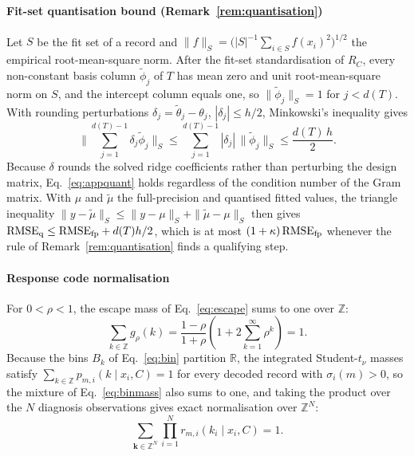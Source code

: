 \paragraph{Fit-set quantisation bound (Remark~\ref{rem:quantisation})} Let \(S\) be the fit set of a record and \(\|f\|_S=\big(|S|^{-1}\sum_{i\in S}f(x_i)^2\big)^{1/2}\) the empirical root-mean-square norm. After the fit-set standardisation of \(R_C\), every non-constant basis column \(\widetilde\phi_j\) of \(T\) has mean zero and unit root-mean-square norm on \(S\), and the intercept column equals one, so \(\|\widetilde\phi_j\|_S=1\) for \(j<d(T)\). With rounding perturbations \(\delta_j=\widetilde\theta_j-\theta_j\), \(|\delta_j|\le h/2\), Minkowski's inequality gives
\begin{equation}\label{eq:appquant}
\Big\|\sum_{j=1}^{d(T)-1}\delta_j\widetilde\phi_j\Big\|_{S}
\le\sum_{j=1}^{d(T)-1}|\delta_j|\,\|\widetilde\phi_j\|_{S}
\le\frac{d(T)\,h}{2}.
\end{equation}
Because \(\delta\) rounds the solved ridge coefficients rather than perturbing the design matrix, Eq.~\eqref{eq:appquant} holds regardless of the condition number of the Gram matrix. With \(\mu\) and \(\widetilde\mu\) the full-precision and quantised fitted values, the triangle inequality \(\|y-\widetilde\mu\|_S\le\|y-\mu\|_S+\|\widetilde\mu-\mu\|_S\) then gives \(\mathrm{RMSE}_{\rm q}\le\mathrm{RMSE}_{\rm fp}+d(T)h/2\), which is at most \((1+\kappa)\,\mathrm{RMSE}_{\rm fp}\) whenever the rule of Remark~\ref{rem:quantisation} finds a qualifying step.

\paragraph{Response code normalisation} For \(0<\rho<1\), the escape mass of Eq.~\eqref{eq:escape} sums to one over \(\mathbb Z\):
\begin{equation}\label{eq:appgeom}
\sum_{k\in\mathbb Z}g_\rho(k)
=\frac{1-\rho}{1+\rho}\left(1+2\sum_{k=1}^{\infty}\rho^k\right)=1.
\end{equation}
Because the bins \(B_k\) of Eq.~\eqref{eq:bin} partition \(\mathbb R\), the integrated Student-\(t_\nu\) masses satisfy \(\sum_{k\in\mathbb Z}p_{m,i}(k\mid x_i,C)=1\) for every decoded record with \(\sigma_i(m)>0\), so the mixture of Eq.~\eqref{eq:binmass} also sums to one, and taking the product over the \(N\) diagnosis observations gives exact normalisation over \(\mathbb Z^N\):
\begin{equation}\label{eq:appresponsevector}
\sum_{\mathbf k\in\mathbb Z^N}\prod_{i=1}^{N}r_{m,i}(k_i\mid x_i,C)=1.
\end{equation}

